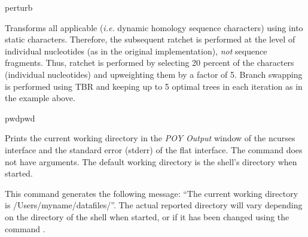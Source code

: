\begin{command}{perturb}{}
\begin{poyexamples}
            {Transforms all applicable (\emph{i.e.} dynamic homology sequence characters) using
             into static characters. 
            Therefore, the subsequent ratchet is performed at the level of
            individual nucleotides (as in the original implementation), \emph{not}
            sequence fragments. Thus, ratchet is performed by selecting 20 percent of
            the characters (individual nucleotides) and upweighting them by a factor of 5.
            Branch swapping is performed using TBR and keeping up to 5 optimal trees in 
            each iteration as in the example above.}

	\end{poyexamples}
               
	\begin{poyalso}
	\end{poyalso}
	
\end{command}

\begin{command}{pwd}{pwd}

	\syntax{\obligatory{()}}
	
	\begin{poydescription}
         Prints the current working directory in the \emph{POY Output} window of
         the ncurses interface and the standard error (stderr) of the flat interface.
         The command  does not have arguments. The default
         working directory is the shell's directory when \poy started.
	\end{poydescription}
	
	\begin{poyexamples}
		\poyexample{pwd()}
            {This command generates the following message: ``The current
            working directory is /Users/myname/datafiles/''. The actual reported
            directory will vary depending on the directory of the shell when
            \poy started, or if it has been changed using the command
            .}
    \end{poyexamples}

    \begin{poyalso}
    \end{poyalso}

\end{command}

